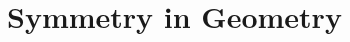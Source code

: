 \documentclass[12pt,a4paper]{memoir}
\begin{document}
    \chapter{Symmetry in Geometry}
    
%    
%    
%    
%    
%    
%    
%    
%    
%    
\end{document}
